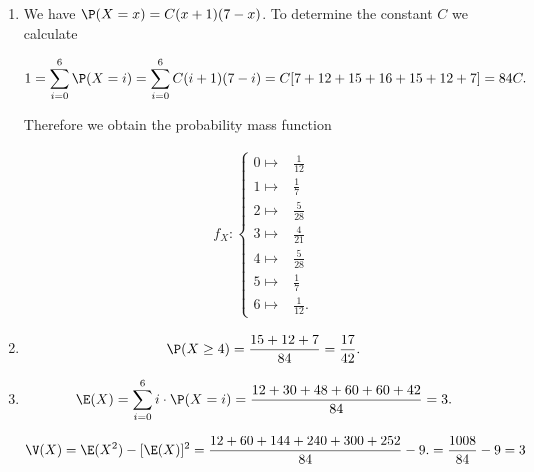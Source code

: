 \begin{solution}

\phantom{}

\begin{enumerate}[label = (\alph*)]
  \item We have $\P(X = x) = C(x+1)(7-x)$. To determine the constant $C$ we calculate

  \begin{align*}
    1 = \sum_{i=0}^6 \P(X = i) = \sum_{i=0}^6 C(i+1)(7-i)
    = C[7 + 12 + 15 + 16 + 15 + 12 + 7] = 84C.
  \end{align*}

  Therefore we obtain the probability mass function

  \begin{align*}
    f_X: \begin{cases}
      0 \mapsto & \frac{1}{12} \\
      1 \mapsto & \frac{1}{7} \\
      2 \mapsto & \frac{5}{28} \\
      3 \mapsto & \frac{4}{21} \\
      4 \mapsto & \frac{5}{28} \\
      5 \mapsto & \frac{1}{7} \\
      6 \mapsto & \frac{1}{12}.
    \end{cases}
  \end{align*}

  \item

  \begin{align*}
    \P(X \geq 4) = \frac{15 + 12 + 7}{84} = \frac{17}{42}.
  \end{align*}

  \item

  \begin{align*}
    \E(X) = \sum_{i=0}^6 i \cdot \P(X = i)
    = \frac{12 + 30 + 48 + 60 + 60 + 42}{84} = 3.
  \end{align*}

  \begin{align*}
    \V(X) = \E(X^2) - [\E(X)]^2 = \frac{12 + 60 + 144 + 240 + 300 + 252}{84} - 9.
    = \frac{1008}{84} - 9 = 3
  \end{align*}

\end{enumerate}



\end{solution}

